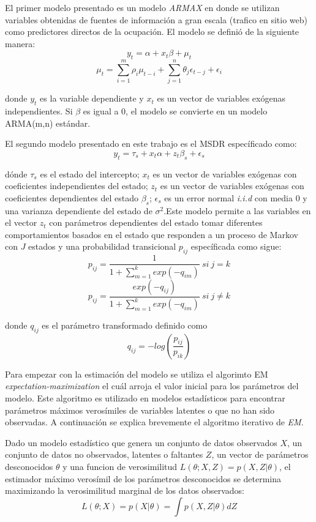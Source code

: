 {El primer modelo presentado es un modelo \emph{ARMAX} en donde se utilizan variables obtenidas de fuentes de información a gran escala (trafico en sitio web) como predictores directos de la ocupación. El modelo se definió de la siguiente manera: $$y_t = \alpha + x_t \beta + \mu_t$$ $$\mu_t = \sum_{i=1}^{m} \rho_i \mu_{t-i} + \sum_{j=1}^{n} \theta_j \epsilon_{t-j} + \epsilon_i$$

donde $y_t$ es la variable dependiente y $x_t$ es un vector de variables exógenas independientes. Si $\beta$ es igual a 0, el modelo se convierte en un modelo ARMA(m,n) estándar.

El segundo modelo presentado en este trabajo es el MSDR específicado como: $$y_t = \tau_s + x_t \alpha + z_t \beta_s + \epsilon_s$$

dónde $\tau_s$ es el estado del intercepto; $x_t$ es un vector de variables exógenas con coeficientes independientes del estado; $z_t$ es un vector de variables exógenas con coeficientes dependientes del estado $\beta_s$; $\epsilon_s$ es un error normal \emph{i.i.d} con media 0 y una varianza dependiente del estado de $\sigma^2$.Este modelo permite a las variables en el vector $z_t$ con parámetros dependientes del estado tomar diferentes comportamientos basados en el estado que responden a un proceso de Markov con $J$ estados y una probabilidad transicional $p_{ij}$ específicada como sigue: $$p_{ij} = \frac{1}{1 + \sum_{m=1}^{k} exp(-q_{im})}\ si\ j = k$$ $$p_{ij} = \frac{exp(-q_{ij})}{1 + \sum_{m=1}^{k} exp(-q_{im})}\ si\ j \neq k$$

donde $q_{ij}$ es el parámetro transformado definido como $$q_{ij}=-log(\frac{p_{ij}}{p_{ik}})$$

Para empezar con la estimación del modelo se utiliza el algorimto EM \emph{expectation-maximization} el cuál arroja el valor inicial para los parámetros del modelo. Este algoritmo es utilizado en modelos estadísticos para encontrar parámetros máximos verosímiles de variables latentes o que no han sido observadas. A continuación se explica brevemente el algoritmo iterativo de \emph{EM}.

Dado un modelo estadístico que genera un conjunto de datos observados $X$, un conjunto de datos no observados, latentes o faltantes $Z$, un vector de parámetros desconocidos $\theta$ y una funcion de verosimilitud $L(\theta;X,Z) = p(X,Z|\theta)$, el estimador máximo verosímil de los parámetros desconocidos se determina maximizando la verosimilitud marginal de los datos observados: $$L(\theta;X) = p(X|\theta) = \int p(X,Z|\theta)dZ$$

}
